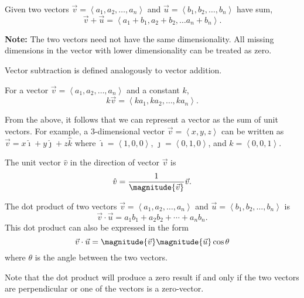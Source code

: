 \begin{definition}
    Given two vectors $\vec{v} = \left<a_{1}, a_{2}, \dots, a_{n}\right>$ and $\vec{u} = \left<b_{1}, b_{2}, \dots, b_{n}\right>$ have sum,
    \[\vec{v} + \vec{u} = \left<a_{1} + b_{1}, a_{2} + b_{2}, \dots a_{n} + b_{n}\right>.\]

    \textbf{Note:} The two vectors need not have the same dimensionality. All missing dimensions in the vector with lower dimensionality can be treated as zero.
\end{definition}

\begin{definition}
    Vector subtraction is defined analogously to vector addition.
\end{definition}

\begin{definition}
    For a vector $\vec{v} = \left<a_{1}, a_{2}, \dots, a_{n}\right>$ and a constant $k$,
    \[k\vec{v} = \left<ka_{1}, ka_{2}, \dots, ka_{n}\right>.\]
\end{definition}

\begin{corollary}
    From the above, it follows that we can represent a vector as the sum of unit vectors. For example, a 3-dimensional vector $\vec{v} = \left<x, y, z\right>$ can be written as $\vec{v} = x\hat{\imath} + y\hat{\jmath} + z\hat{k}$ where $\hat{\imath} = \left<1, 0, 0\right>$, $\hat{\jmath} = \left<0, 1, 0\right>$, and $\hat{k} = \left<0, 0, 1\right>$.
\end{corollary}

\begin{definition}
    The unit vector $\hat{v}$ in the direction of vector $\vec{v}$ is
    \[\hat{v} = \frac{1}{\magnitude{\vec{v}}}\vec{v}.\]
\end{definition}

\begin{definition}
    The dot product of two vectors $\vec{v} = \left<a_{1}, a_{2}, \dots, a_{n}\right>$ and $\vec{u} = \left<b_{1}, b_{2}, \dots, b_{n}\right>$ is
    \[\vec{v} \cdot \vec{u} = a_{1}b_{1} + a_{2}b_{2} + \cdots + a_{n}b_{n}.\]
    This dot product can also be expressed in the form
    \[\vec{v} \cdot \vec{u} = \magnitude{\vec{v}}\magnitude{\vec{u}}\cos\theta\]
    where $\theta$ is the angle between the two vectors.
\end{definition}

\begin{remark}
    Note that the dot product will produce a zero result if and only if the two vectors are perpendicular or one of the vectors is a zero-vector.
\end{remark}